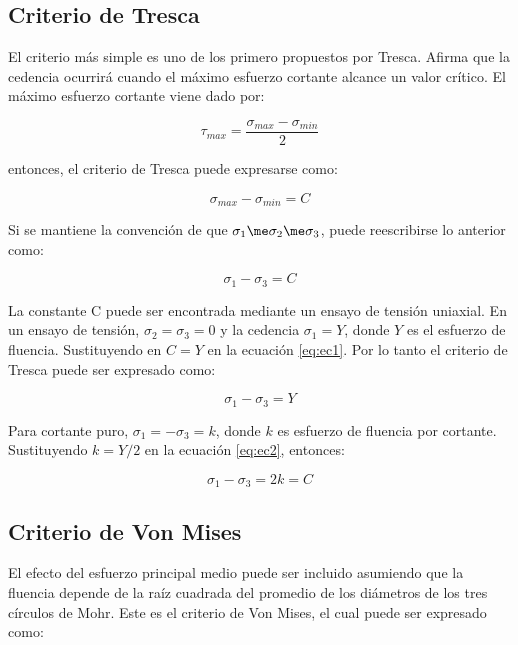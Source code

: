\subsection{Criterio de Tresca}

El criterio más simple es uno de los primero propuestos por Tresca. Afirma que la cedencia 
ocurrirá cuando el máximo esfuerzo cortante alcance un valor crítico. El máximo esfuerzo 
cortante viene dado por:

\begin{equation}
\tau_{max} = \frac{\sigma_{max}-\sigma_{min}}{2}
\end{equation}

entonces, el criterio de Tresca puede expresarse como:

\begin{equation}
\sigma_{max} - \sigma_{min} = C
\end{equation}

Si se mantiene la convención de que $ \sigma_1 \me \sigma_2 \me \sigma_3 $, puede reescribirse lo anterior como:

\begin{equation}\label{eq:ec1}
\sigma_1 - \sigma_3 = C
\end{equation}

La constante C puede ser encontrada mediante un ensayo de tensión uniaxial. En un ensayo de tensión, 
$\sigma_2 = \sigma_3 = 0$ y la cedencia $\sigma_1 = Y$, donde $Y$ es el esfuerzo de fluencia. Sustituyendo 
en $C=Y$ en la ecuación \ref{eq:ec1}. Por lo tanto el criterio de Tresca puede ser expresado como:

\begin{equation}\label{eq:ec2}
\sigma_1 - \sigma_3 = Y
\end{equation}

Para cortante puro, $ \sigma_1 = -\sigma_3 = k$, donde $k$ es esfuerzo de fluencia por cortante. Sustituyendo 
$ k = Y/2 $ en la ecuación \ref{eq:ec2}, entonces:

\begin{equation}
\sigma_1 - \sigma_3 = 2k = C
\end{equation}

\subsection{Criterio de Von Mises}

El efecto del esfuerzo principal medio puede ser incluido asumiendo que la fluencia depende de la raíz cuadrada 
del promedio de los diámetros de los tres círculos de Mohr. Este es el criterio de Von Mises, el cual puede ser 
expresado como:


